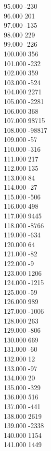 { 95.000	-230 \\
 96.000	201 \\
 97.000	-135 \\
 98.000	229 \\
 99.000	-226 \\
 100.000	356 \\
 101.000	-232 \\
 102.000	359 \\
 103.000	-524 \\
 104.000	2271 \\
 105.000	-2281 \\
 106.000	368 \\
 107.000	98715 \\
 108.000	-98817 \\
 109.000	-57 \\
 110.000	-316 \\
 111.000	217 \\
 112.000	135 \\
 113.000	84 \\
 114.000	-27 \\
 115.000	-506 \\
 116.000	498 \\
 117.000	9445 \\
 118.000	-8766 \\
 119.000	-634 \\
 120.000	64 \\
 121.000	-82 \\
 122.000	-9 \\
 123.000	1206 \\
 124.000	-1215 \\
 125.000	-59 \\
 126.000	989 \\
 127.000	-1006 \\
 128.000	263 \\
 129.000	-806 \\
 130.000	669 \\
 131.000	-60 \\
 132.000	12 \\
 133.000	-97 \\
 134.000	20 \\
 135.000	-329 \\
 136.000	516 \\
 137.000	-441 \\
 138.000	2619 \\
 139.000	-2338 \\
 140.000	1154 \\
 141.000	1449 \\
}
